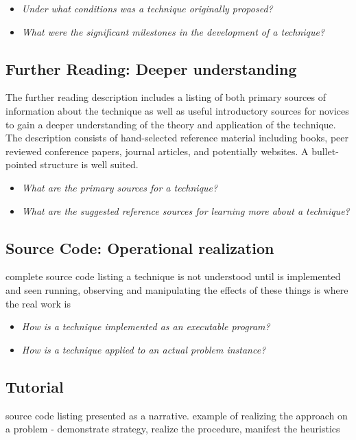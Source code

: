 \documentclass[a4paper, 11pt]{article}
\begin{document}
\begin{itemize}
	\item \emph{Under what conditions was a technique originally proposed?}
	\item \emph{What were the significant milestones in the development of a technique?}
\end{itemize}

\subsection{Further Reading: Deeper understanding}
The further reading description includes a listing of both primary sources of information about the technique as well as useful introductory sources for novices to gain a deeper understanding of the theory and application of the technique. The description consists of hand-selected reference material including books, peer reviewed conference papers, journal articles, and potentially websites. A bullet-pointed structure is well suited. 

\begin{itemize}
	\item \emph{What are the primary sources for a technique?}
	\item \emph{What are the suggested reference sources for learning more about a technique?}
\end{itemize}

\subsection{Source Code: Operational realization}
complete source code listing
a technique is not understood until is implemented and seen running, observing and manipulating the effects of these things is where the real work is 

\begin{itemize}
	\item \emph{How is a technique implemented as an executable program?}
	\item \emph{How is a technique applied to an actual problem instance?}
\end{itemize}

\subsection{Tutorial}
source code listing presented as a narrative. example of realizing the approach on a problem - demonstrate strategy, realize the procedure, manifest the heuristics
\end{document}
